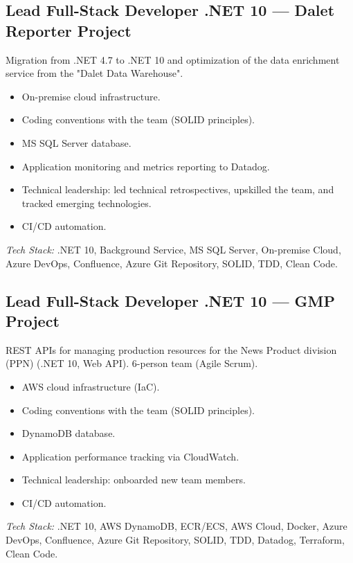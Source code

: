 \documentclass[10pt,a4paper]{article}
\begin{document}
\subsection*{Lead Full-Stack Developer .NET 10 --- Dalet Reporter Project}
\color{darkgray}
Migration from .NET 4.7 to .NET 10 and optimization of the data enrichment service from the "Dalet Data Warehouse".
\begin{itemize}
  \item On-premise cloud infrastructure.
  \item Coding conventions with the team (SOLID principles).
  \item MS SQL Server database.
  \item Application monitoring and metrics reporting to Datadog.
  \item Technical leadership: led technical retrospectives, upskilled the team, and tracked emerging technologies.
  \item CI/CD automation.
\end{itemize}
\textit{Tech Stack:} .NET 10, Background Service, MS SQL Server, On-premise Cloud, Azure DevOps, Confluence, Azure Git Repository, SOLID, TDD, Clean Code.

\vspace{6pt}

\subsection*{Lead Full-Stack Developer .NET 10 --- GMP Project}
\color{darkgray}
REST APIs for managing production resources for the News Product division (PPN) (.NET 10, Web API). 6-person team (Agile Scrum).
\begin{itemize}
  \item AWS cloud infrastructure (IaC).
  \item Coding conventions with the team (SOLID principles).
  \item DynamoDB database.
  \item Application performance tracking via CloudWatch.
  \item Technical leadership: onboarded new team members.
  \item CI/CD automation.
\end{itemize}
\textit{Tech Stack:} .NET 10, AWS DynamoDB, ECR/ECS, AWS Cloud, Docker, Azure DevOps, Confluence, Azure Git Repository, SOLID, TDD, Datadog, Terraform, Clean Code.

\vspace{6pt}
\end{document}
